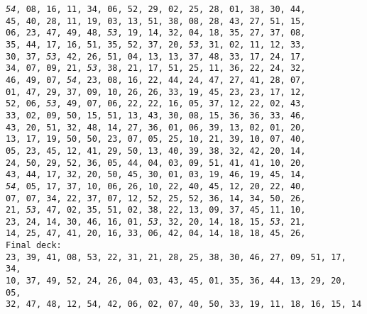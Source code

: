 \documentclass[a4paper,parskip,12pt]{scrartcl}
\begin{document}
\setlength{\baselineskip}{1cm}

   \texttt{\emph{54}, 08, 16, 11, 34, 06, 52, 29, 02, 25, 28, 01, 38, 30, 44,}
\\ \texttt{45, 40, 28, 11, 19, 03, 13, 51, 38, 08, 28, 43, 27, 51, 15,}
\\ \texttt{06, 23, 47, 49, 48, \emph{53}, 19, 14, 32, 04, 18, 35, 27, 37, 08,}
\\ \texttt{35, 44, 17, 16, 51, 35, 52, 37, 20, \emph{53}, 31, 02, 11, 12, 33,}
\\ \texttt{30, 37, \emph{53}, 42, 26, 51, 04, 13, 13, 37, 48, 33, 17, 24, 17,}
\\ \texttt{34, 07, 09, 21, \emph{53}, 38, 21, 17, 51, 25, 11, 36, 22, 24, 32,}
\\ \texttt{46, 49, 07, \emph{54}, 23, 08, 16, 22, 44, 24, 47, 27, 41, 28, 07,}
\\ \texttt{01, 47, 29, 37, 09, 10, 26, 26, 33, 19, 45, 23, 23, 17, 12,}
\\ \texttt{52, 06, \emph{53}, 49, 07, 06, 22, 22, 16, 05, 37, 12, 22, 02, 43,}
\\ \texttt{33, 02, 09, 50, 15, 51, 13, 43, 30, 08, 15, 36, 36, 33, 46,}
\\ \texttt{43, 20, 51, 32, 48, 14, 27, 36, 01, 06, 39, 13, 02, 01, 20,}
\\ \texttt{13, 17, 19, 50, 50, 23, 07, 05, 25, 10, 21, 39, 10, 07, 40,}
\\ \texttt{05, 23, 45, 12, 41, 29, 50, 13, 40, 39, 38, 32, 42, 20, 14,}
\\ \texttt{24, 50, 29, 52, 36, 05, 44, 04, 03, 09, 51, 41, 41, 10, 20,}
\\ \texttt{43, 44, 17, 32, 20, 50, 45, 30, 01, 03, 19, 46, 19, 45, 14,}
\\ \texttt{\emph{54}, 05, 17, 37, 10, 06, 26, 10, 22, 40, 45, 12, 20, 22, 40,}
\\ \texttt{07, 07, 34, 22, 37, 07, 12, 52, 25, 52, 36, 14, 34, 50, 26,}
\\ \texttt{21, \emph{53}, 47, 02, 35, 51, 02, 38, 22, 13, 09, 37, 45, 11, 10,}
\\ \texttt{23, 24, 14, 30, 46, 16, 01, \emph{53}, 32, 20, 14, 18, 15, \emph{53}, 21,}
\\ \texttt{14, 25, 47, 41, 20, 16, 33, 06, 42, 04, 14, 18, 18, 45, 26,}
\\ \texttt{Final deck: \\ 23, 39, 41, 08, 53, 22, 31, 21, 28, 25, 38, 30, 46, 27, 09, 51, 17, 34, \\ 10, 37, 49, 52, 24, 26, 04, 03, 43, 45, 01, 35, 36, 44, 13, 29, 20, 05, \\ 32, 47, 48, 12, 54, 42, 06, 02, 07, 40, 50, 33, 19, 11, 18, 16, 15, 14}
\end{document}
